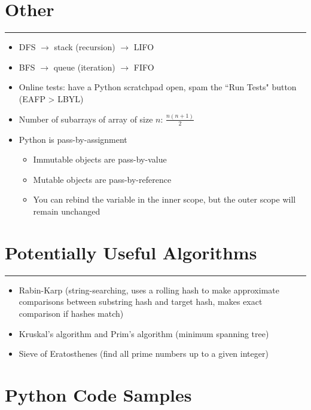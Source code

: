 \documentclass[12pt]{article}
\begin{document}
\section*{Other}
\hrule\vspace{5ex}

\begin{itemize}
  \item DFS $\rightarrow$ stack (recursion) $\rightarrow$ LIFO
  \item BFS $\rightarrow$ queue (iteration) $\rightarrow$ FIFO
  \item Online tests: have a Python scratchpad open, spam the ``Run Tests" button (EAFP > LBYL)
  \item Number of subarrays of array of size $n$: $\frac{n(n+1)}{2}$
  \item Python is pass-by-assignment
  \begin{itemize}
    \item Immutable objects are pass-by-value
    \item Mutable objects are pass-by-reference
    \item You can rebind the variable in the inner scope, but the outer scope will remain unchanged
  \end{itemize}
\end{itemize}

\section*{Potentially Useful Algorithms}
\hrule\vspace{5ex}

\begin{itemize}
  \item Rabin-Karp (string-searching, uses a rolling hash to make approximate comparisons between substring hash and target hash, makes exact comparison if hashes match)
  \item Kruskal's algorithm and Prim's algorithm (minimum spanning tree)
  \item Sieve of Eratosthenes (find all prime numbers up to a given integer)
\end{itemize}

\appendix

\section{Python Code Samples}
\end{document}
